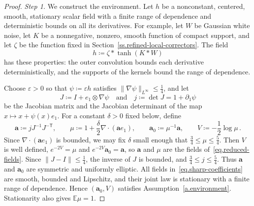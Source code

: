 \documentclass[11pt]{amsart}
\theoremstyle{definition}
\theoremstyle{remark}
\numberwithin{equation}{section}
\newcommand{\E}{\mathbb E}
\renewcommand{\a}{\mathbf a}
\renewcommand{\epsilon}{\varepsilon}
\begin{document}
\begin{proof}
\emph{Step 1.} We construct the environment. Let $h$ be a nonconstant, centered, smooth, stationary scalar field with a finite range of dependence and deterministic bounds on all its derivatives. For example, let $W$ be Gaussian white noise, let $K$ be a nonnegative, nonzero, smooth function of compact support, and let $\zeta$ be the function fixed in Section~\ref{ss.refined-local-correctors}. The field
\begin{equation*}
 h\coloneqq\zeta*\tanh(K*W)
\end{equation*}
has these properties: the outer convolution bounds each derivative deterministically, and the supports of the kernels bound the range of dependence.

Choose $\epsilon>0$ so that $\psi\coloneqq\epsilon h$ satisfies $\|\nabla\psi\|_{L^\infty}\leq\tfrac14$, and let
\begin{equation}\label{eq.sharp-map}
 J\coloneqq I+e_1\otimes\nabla\psi
 \quad\text{and}\quad
 j\coloneqq\det J=1+\partial_1\psi
\end{equation}
be the Jacobian matrix and the Jacobian determinant of the map $x\mapsto x+\psi(x)e_1$. For a constant $\delta>0$ fixed below, define
\begin{equation}\label{eq.sharp-coefficients}
 \a\coloneqq jJ^{-1}J^{-\mathsf T},\qquad
 \mu\coloneqq1+\frac{\delta}{2}\nabla\cdot(\a e_1),\qquad
 \a_0\coloneqq\mu^{-1}\a,\qquad
 V\coloneqq-\frac12\log\mu\, .
\end{equation}
Since $\nabla\cdot(\a e_1)$ is bounded, we may fix $\delta$ small enough that $\tfrac34\leq\mu\leq\tfrac54$. Then $V$ is well defined, $e^{-2V}=\mu$ and $e^{-2V}\a_0=\a$, so $\a$ and $\mu$ are the fields of~\eqref{eq.reduced-fields}. Since $\|J-I\|\leq\tfrac14$, the inverse of $J$ is bounded, and $\tfrac34\leq j\leq\tfrac54$. Thus $\a$ and $\a_0$ are symmetric and uniformly elliptic. All fields in~\eqref{eq.sharp-coefficients} are smooth, bounded and Lipschitz, and their joint law is stationary with a finite range of dependence. Hence $(\a_0,V)$ satisfies Assumption~\ref{a.environment}. Stationarity also gives $\E\mu=1$.


\end{proof}
\end{document}
